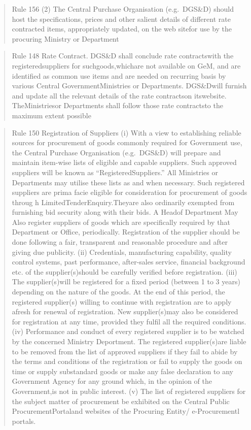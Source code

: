 \documentclass[
  11pt,
  twoside]{article}
\begin{document}
\begin{quote}
Rule 156 (2) The Central Purchase Organisation (e.g.~DGS\&D) should host the specifications, prices and other salient details of different rate contracted items, appropriately updated, on the web sitefor use by the procuring Ministry or Department
\end{quote}

\begin{quote}
Rule 148 Rate Contract. DGS\&D shall conclude rate contractswith the registeredsuppliers for suchgoods,whichare not available on GeM, and are identified as common use items and are needed on recurring basis by various Central GovernmentMinistries or Departments. DGS\&Dwill furnish and update all the relevant details of the rate contractson itswebsite. TheMinistriesor Departments shall follow those rate contractsto the maximum extent possible
\end{quote}

\begin{quote}
Rule 150 Registration of Suppliers
(i) With a view to establishing reliable sources for procurement of goods commonly required for Government use, the Central Purchase Organisation (e.g.~DGS\&D) will prepare and maintain item-wise lists of eligible and capable suppliers. Such approved suppliers will be known as ``RegisteredSuppliers.'' All Ministries or Departments may utilise these lists as and when necessary. Such registered suppliers are prima facie eligible for consideration for procurement of goods throug h LimitedTenderEnquiry.Theyare also ordinarily exempted from furnishing bid security along with their bids. A Headof Department May Also register suppliers of goods which are specifically required by that Department or Office, periodically. Registration of the supplier should be done following a fair, transparent and reasonable procedure and after giving due publicity.
(ii) Credentials, manufacturing capability, quality control systems, past performance, after-sales service, financial background etc. of the supplier(s)should be carefully verified before registration.
(iii) The supplier(s)will be registered for a fixed period (between 1 to 3 years) depending on the nature of the goods. At the end of this period, the registered supplier(s) willing to continue with registration are to apply afresh for renewal of registration. New supplier(s)may also be considered for registration at any time, provided they fulfil all the required conditions.
(iv) Performance and conduct of every registered supplier is to be watched by the concerned Ministry Deportment. The registered supplier(s)are liable to be removed from the list of approved suppliers if they fail to abide by the terms and conditions of the registration or fail to supply the goods on time or supply substandard goods or make any false declaration to any Government Agency for any ground which, in the opinion of the Government,is not in public interest. (v) The list of registered suppliers for the subject matter of procurement be exhibited on the Central Public ProcurementPortaland websites of the Procuring Entity/ e-Procurementl portals.
\end{quote}
\end{document}
